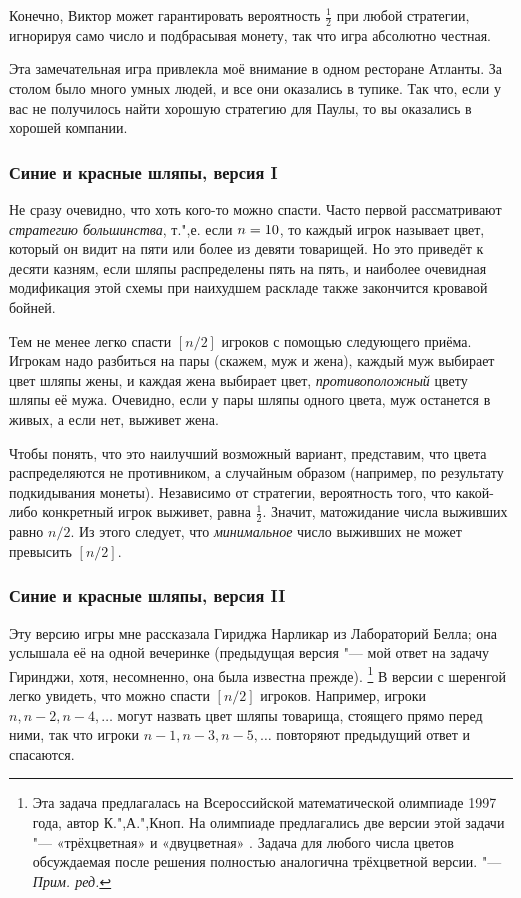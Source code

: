 \documentclass[twoside]{book}
\begin{document}
Конечно, Виктор может гарантировать вероятность $\tfrac12$ при любой стратегии, игнорируя само число и подбрасывая монету, так что игра абсолютно честная.
\heart

Эта замечательная игра привлекла моё внимание в одном ресторане Атланты.
За столом было много умных людей, и все они оказались в тупике.
Так что, если у вас не получилось найти хорошую стратегию для Паулы, то вы оказались в хорошей компании.

\subsubsection*{Синие и красные шляпы, версия I}%

Не сразу очевидно, что хоть кого-то можно спасти.
Часто первой рассматривают \emph{стратегию большинства},
т.",е. если $n\z=10$, то каждый игрок называет цвет, который он видит на пяти или более из девяти товарищей.
Но это приведёт к десяти казням, если шляпы распределены пять на пять, и наиболее очевидная модификация этой схемы при наихудшем раскладе также закончится кровавой бойней.

\medskip

Тем не менее легко спасти $[n/2]$ игроков с помощью следующего приёма.
Игрокам надо разбиться на пары (скажем, муж и жена), каждый муж выбирает цвет шляпы жены, и каждая жена выбирает цвет, \emph{противоположный} цвету шляпы её мужа.
Очевидно, если у пары шляпы одного цвета, муж останется в живых, а если нет, выживет жена.

Чтобы понять, что это наилучший возможный вариант, представим, что цвета распределяются не противником, а случайным образом 
(например, по результату подкидывания монеты).
Независимо от стратегии, вероятность того, что какой-либо конкретный игрок выживет, равна $\tfrac12$.
Значит, матожидание числа выживших равно $n/2$. 
Из этого следует, что \emph{минимальное} число выживших не может превысить $[n/2]$.\heart

\subsubsection*{Синие и красные шляпы, версия II}%

Эту версию игры мне рассказала Гириджа Нарликар из Лабораторий Белла; %
она услышала её на одной вечеринке (предыдущая версия "--- мой ответ на задачу Гиринджи, хотя, несомненно, она была известна прежде).%
\footnote{Эта задача предлагалась на Всероссийской математической олимпиаде 1997 года, автор  К.",А.",Кноп. 
На олимпиаде предлагались две версии этой задачи "--- «трёхцветная» и «двуцветная» \cite[№ 524 и № 538]{ВсеРос2007}. 
Задача для любого числа цветов обсуждаемая после решения полностью аналогична трёхцветной версии. "--- \emph{Прим. ред.}}
В версии с шеренгой легко увидеть, что можно спасти $[n/2]$ игроков.
Например, игроки $n, n-2, n-4,\dots$
могут назвать цвет шляпы товарища, стоящего прямо перед ними, так что игроки $n-1, n-3,n-5,\dots$
повторяют предыдущий ответ и спасаются.
\end{document}
